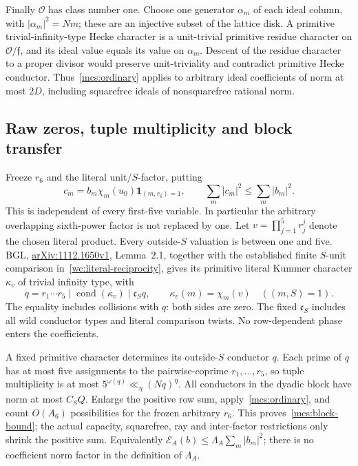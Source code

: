 \documentclass[11pt]{article}
\theoremstyle{definition}\newtheorem{definition}[theorem]{Definition}
\theoremstyle{remark}\newtheorem{remark}[theorem]{Remark}
\begin{document}
Finally $\mathcal O$ has class number one. Choose one generator
$\alpha_m$ of each ideal column, with $|\alpha_m|^2=Nm$; these are an
injective subset of the lattice disk. A primitive trivial-infinity-type
Hecke character is a unit-trivial primitive residue character on
$\mathcal O/\mathfrak f$, and its ideal value equals its value on
$\alpha_m$. Descent of the residue character to a proper divisor would
preserve unit-triviality and contradict primitive Hecke conductor.
Thus~\eqref{mcs:ordinary} applies to arbitrary ideal coefficients of
norm at most $2D$, including squarefree ideals of nonsquarefree rational norm.

\subsection{Raw zeros, tuple multiplicity and block transfer}
Freeze $r_6$ and the literal unit/$S$-factor, putting
\[
 c_m=b_m\chi_m(u_0)\mathbf1_{(m,r_6)=1},\qquad
       \sum_m|c_m|^2\le\sum_m|b_m|^2.
\]
This is independent of every first-five variable. In particular the
arbitrary overlapping sixth-power factor is not replaced by one.
Let $v=\prod_{j=1}^5r_j^j$ denote the chosen literal product.
Every outside-$S$ valuation is between one and five.
BGL, \href{https://arxiv.org/pdf/1112.1650v1}{arXiv:1112.1650v1},
Lemma~2.1, together with the established finite $S$-unit comparison
in~\eqref{wc:literal-reciprocity}, gives its primitive literal Kummer
character $\kappa_v$ of trivial infinity type, with
\[
 q=r_1\cdots r_5\mid\operatorname{cond}(\kappa_v)\mid\mathfrak c_Sq,
 \qquad \kappa_v(m)=\chi_m(v)\quad((m,S)=1).
\]
The equality includes collisions with $q$: both sides are zero.
The fixed $\mathfrak c_S$ includes all wild conductor types and literal
comparison twists. No row-dependent phase enters the coefficients.

A fixed primitive character determines its outside-$S$ conductor $q$.
Each prime of $q$ has at most five assignments to the pairwise-coprime
$r_1,\ldots,r_5$, so tuple multiplicity is at most
$5^{\omega(q)}\ll_\eta(Nq)^\eta$.
All conductors in the dyadic block have norm at most $C_SQ$.
Enlarge the positive row sum, apply~\eqref{mcs:ordinary}, and count
$O(A_6)$ possibilities for the frozen arbitrary $r_6$.
This proves~\eqref{mcs:block-bound}; the actual capacity, squarefree,
ray and inter-factor restrictions only shrink the positive sum.
Equivalently $\mathcal E_A(b)\le\Lambda_A\sum_m|b_m|^2$;
there is no coefficient norm factor in the definition of $\Lambda_A$.
\end{document}
